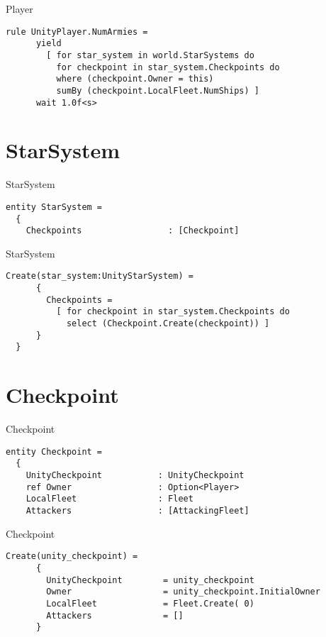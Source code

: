 \documentclass{beamer}
\begin{document}
\begin{frame}[fragile]{Player}
\begin{lstlisting}[frame=shadowbox]
    rule UnityPlayer.NumArmies =
      yield 
        [ for star_system in world.StarSystems do
          for checkpoint in star_system.Checkpoints do
          where (checkpoint.Owner = this)
          sumBy (checkpoint.LocalFleet.NumShips) ]
      wait 1.0f<s>
\end{lstlisting}
\end{frame}


\section{StarSystem}
\begin{frame}[fragile]{StarSystem}
\begin{lstlisting}[frame=shadowbox]
entity StarSystem = 
  {
    Checkpoints                 : [Checkpoint]
\end{lstlisting}
\end{frame}

\begin{frame}[fragile]{StarSystem}
\begin{lstlisting}[frame=shadowbox]
    Create(star_system:UnityStarSystem) = 
      {
        Checkpoints = 
          [ for checkpoint in star_system.Checkpoints do
            select (Checkpoint.Create(checkpoint)) ]
      }
  }
\end{lstlisting}
\end{frame}


\section{Checkpoint}
\begin{frame}[fragile]{Checkpoint}
\begin{lstlisting}[frame=shadowbox]
entity Checkpoint =
  {
    UnityCheckpoint           : UnityCheckpoint
    ref Owner                 : Option<Player>
    LocalFleet                : Fleet
    Attackers                 : [AttackingFleet]
\end{lstlisting}
\end{frame}

\begin{frame}[fragile]{Checkpoint}
\begin{lstlisting}[frame=shadowbox]
    Create(unity_checkpoint) =
      {
        UnityCheckpoint        = unity_checkpoint
        Owner                  = unity_checkpoint.InitialOwner
        LocalFleet             = Fleet.Create( 0)
        Attackers              = []
      }
\end{lstlisting}
\end{frame}
\end{document}
